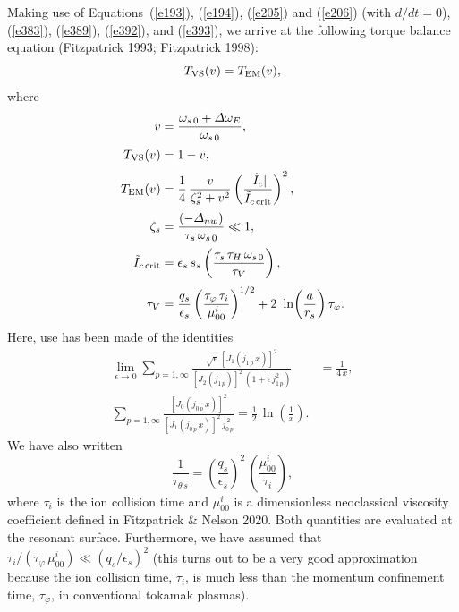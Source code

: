 \documentclass[notitlepage,12pt]{article}
\begin{document}
Making use of Equations~(\ref{e193}), (\ref{e194}), (\ref{e205}) and (\ref{e206}) (with $d/dt=0$), (\ref{e383}), (\ref{e389}), (\ref{e392}),
and (\ref{e393}), we arrive at the following torque balance equation (Fitzpatrick 1993; Fitzpatrick 1998):
\begin{equation}\label{e394}
T_{\rm VS}(v)= T_{\rm EM}(v),
\end{equation}
where 
\begin{align}
v&=\frac{\omega_{s\,0}+{\mit\Delta}\omega_E}{\omega_{s\,0}},\\[0.5ex]
T_{\rm VS}(v) &= 1- v,\\[0.5ex]
T_{\rm EM}(v) &= \frac{1}{4}\,\frac{v}{\zeta_s^{2}+v^2}
\left(\frac{|\tilde{I}_c|}{\tilde{I}_{c\,{\rm crit}}}\right)^2,\\[0.5ex]
\zeta_s &= \frac{(-{\mit\Delta}_{nw})}{\tau_s\,\omega_{s\,0}}\ll 1,\\[0.5ex]
\tilde{I}_{c\,{\rm crit}}&=\epsilon_s\,s_s\left(\frac{\tau_s\,\tau_H\,\omega_{s\,0}}{\tau_V}\right),\label{e420}
\\[0.5ex]
\tau_V&= \frac{q_s}{\epsilon_s}\left(\frac{\tau_\varphi\,\tau_i}{\mu_{00}^i}\right)^{1/2}+ 2\ \ln\!\left(\frac{a}{r_s}\right)\tau_\varphi.\label{e421a}
\end{align}
Here, use has been made of the identities
\begin{align}\label{e417a}
\lim_{\epsilon\rightarrow 0}\sum_{p=1,\infty} \frac{\sqrt{\epsilon}\,[J_1(j_{1\,p}\,x)]^{2}}{[J_2(j_{1\,p})]^2\,(1+\epsilon\,j_{1\,p}^2)}
&=\frac{1}{4\,x},\\[0.5ex]
\sum_{p=1,\infty} \frac{[J_0(j_{0\,p}\,x)]^2}{[J_1(j_{0\,p}\,x)]^2\,j_{0\,p}^{\,2}} =\frac{1}{2}\,\ln\!\left(\frac{1}{x}\right).\label{e418a}
\end{align}
We have also written 
\begin{equation}
\frac{1}{\tau_{\theta\,s}} = \left(\frac{q_s}{\epsilon_s}\right)^2\,\left(\frac{\mu_{00}^i}{\tau_{i}}\right),
\end{equation}
 where
$\tau_i$ is the ion collision time and $\mu_{00}^i$ is a dimensionless neoclassical viscosity coefficient defined in Fitzpatrick \& Nelson 2020. Both quantities are evaluated at the resonant surface. Furthermore,
 we have assumed that $\tau_i/(\tau_\varphi\,\mu_{00}^i)\ll (q_s/\epsilon_s)^2$ (this
turns out to be  
a very good approximation because the ion collision time, $\tau_i$, is much less than the momentum confinement
time, $\tau_\varphi$, in conventional tokamak plasmas).  
\end{document}
